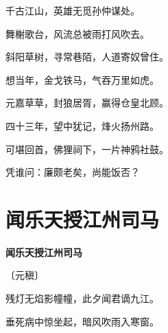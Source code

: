 \documentclass[12pt,UTF-8,openany,fontset=none]{ctexbook}
\begin{document}
\begin{center}
    \begin{Large}

        千古江山，英雄无觅孙仲谋处。\hspace{42pt}

        舞榭歌台，风流总被雨打风吹去。\hspace{24pt}

        斜阳草树，寻常巷陌，人道寄奴曾住。

        \hspace{18pt}想当年，金戈铁马，气吞万里如虎。

        \vspace{18pt}  %

        元嘉草草，封狼居胥，赢得仓皇北顾。

        四十三年，望中犹记，烽火扬州路。\hspace{5pt}

        可堪回首，佛狸祠下，一片神鸦社鼓。

        凭谁问：廉颇老矣，尚能饭否？\hspace{5pt}

    \end{Large}

\end{center}

\vspace{8pt}
\clearpage

\section{闻乐天授江州司马}


\begin{center}
    {\bfseries 闻乐天授江州司马}

    \vspace{18pt}

    \begin{large}\xuwen
        〔元稹〕
    \end{large}

\end{center}

    \vspace{18pt}  %

\begin{center}
    \begin{Large}

        残灯无焰影幢幢，此夕闻君谪九江。

        垂死病中惊坐起，暗风吹雨入寒窗。

    \end{Large}

\end{center}
\end{document}
